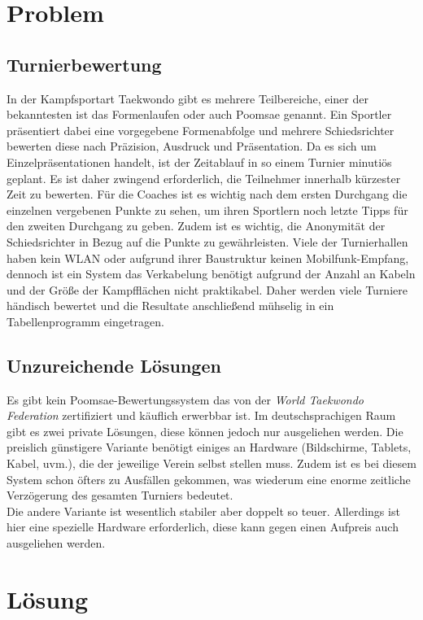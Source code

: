 \section{Problem}

\subsection{Turnierbewertung}
In der Kampfsportart Taekwondo gibt es mehrere Teilbereiche, einer der bekanntesten ist das Formenlaufen oder auch Poomsae genannt.
Ein Sportler präsentiert dabei eine vorgegebene Formenabfolge und mehrere Schiedsrichter bewerten diese nach
Präzision, Ausdruck und Präsentation.
Da es sich um Einzelpräsentationen handelt, ist der Zeitablauf in so einem Turnier minutiös geplant.
Es ist daher zwingend erforderlich, die Teilnehmer innerhalb kürzester Zeit zu bewerten.
Für die Coaches ist es wichtig nach dem ersten Durchgang die einzelnen vergebenen Punkte zu sehen, um ihren Sportlern
    noch letzte Tipps für den zweiten Durchgang zu geben.
Zudem ist es wichtig, die Anonymität der Schiedsrichter in Bezug auf die Punkte zu gewährleisten.
Viele der Turnierhallen haben kein WLAN oder aufgrund ihrer Baustruktur keinen Mobilfunk-Empfang, dennoch ist ein System
das Verkabelung benötigt aufgrund der Anzahl an Kabeln und der Größe der Kampfflächen nicht praktikabel.
Daher werden viele Turniere händisch bewertet und die Resultate anschließend mühselig in ein Tabellenprogramm eingetragen.
	
\subsection{Unzureichende Lösungen}

Es gibt kein Poomsae-Bewertungssystem das von der \emph{World Taekwondo Federation} zertifiziert und käuflich erwerbbar ist.
Im deutschsprachigen Raum gibt es zwei private Lösungen, diese können jedoch nur ausgeliehen werden.
Die preislich günstigere Variante benötigt einiges an Hardware (Bildschirme, Tablets, Kabel, uvm.), die der jeweilige Verein selbst stellen muss.
Zudem ist es bei diesem System schon öfters zu Ausfällen gekommen, was wiederum eine enorme zeitliche
Verzögerung des gesamten Turniers bedeutet.
\\
Die andere Variante ist wesentlich stabiler aber doppelt so teuer.
Allerdings ist hier eine spezielle Hardware erforderlich, diese kann gegen einen Aufpreis auch ausgeliehen werden.

\section{Lösung}


